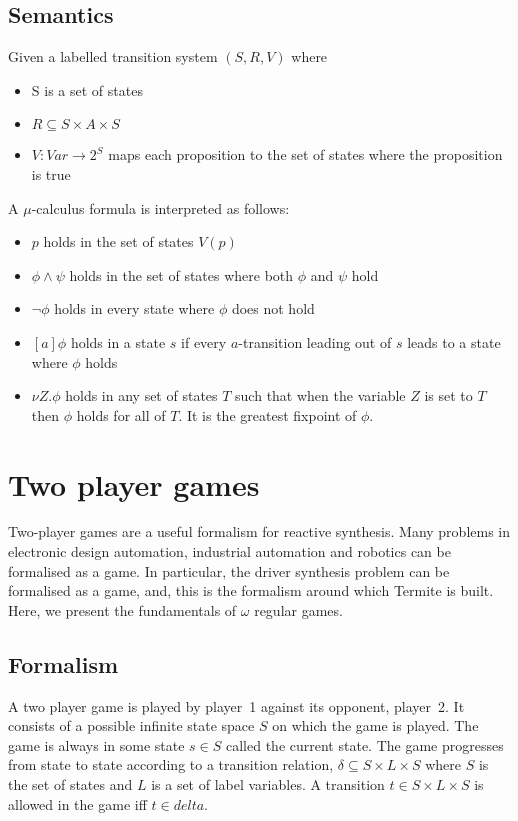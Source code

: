 \documentclass{book}
\theoremstyle{definition}
\begin{document}
\subsection{Semantics}

Given a labelled transition system $(S, R, V)$ where
\begin{itemize}
    \item S is a set of states
    \item $R \subseteq S \times A \times S$
    \item $V : Var \rightarrow 2^S$ maps each proposition to the set of states where the proposition is true
\end{itemize}

A $\mu$-calculus formula is interpreted as follows:
\begin{itemize}
    \item $p$ holds in the set of states $V(p)$
    \item $\phi \wedge \psi$ holds in the set of states where both $\phi$ and $\psi$ hold
    \item $\neg \phi$ holds in every state where $\phi$ does not hold 
    \item $[a]\phi$ holds in a state $s$ if every $a$-transition leading out of $s$ leads to a state where $\phi$ holds
    \item $\nu Z. \phi$ holds in any set of states $T$ such that when the variable $Z$ is set to $T$ then $\phi$ holds for all of $T$. It is the greatest fixpoint of $\phi$.
\end{itemize}

\section{Two player games}

Two-player games are a useful formalism for reactive synthesis. Many problems in electronic design automation, industrial automation and robotics can be formalised as a game. In particular, the driver synthesis problem can be formalised as a game, and, this is the formalism around which Termite is built. Here, we present the fundamentals of $\omega$ regular games. 

\subsection{Formalism}

A two player game is played by player~1 against its opponent, player~2. It consists of a possible infinite state space $S$ on which the game is played. The game is always in some state $s \in S$ called the current state. The game progresses from state to state according to a transition relation, $\delta \subseteq S \times L \times S$ where $S$ is the set of states and $L$ is a set of label variables. A transition $t \in S \times L \times S$ is allowed in the game iff $t \in delta$. 
\end{document}
